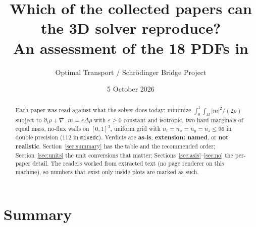 \documentclass[11pt]{article}
\title{Which of the collected papers can the 3D solver reproduce?\\
\large An assessment of the 18 PDFs in \code{Documents/papers/2026/OT\_SB\_examples}}
\author{Optimal Transport / Schr\"odinger Bridge Project}
\date{5 October 2026}
\newcommand{\eps}{\varepsilon}
\newcommand{\code}[1]{\texttt{#1}}
\newcommand{\dv}{\nabla\cdot}
\newcommand{\asis}{\textcolor{OliveGreen}{\textbf{as-is}}}
\newcommand{\ext}[1]{\textcolor{BurntOrange}{\textbf{extension: #1}}}
\newcommand{\no}{\textcolor{BrickRed}{\textbf{not realistic}}}
\begin{document}
\maketitle

\begin{abstract}
Each paper was read against what the solver does today: minimize
$\int_0^1\!\int_\Omega |m|^2/(2\rho)$ subject to
$\partial_t\rho+\dv m=\eps\Delta\rho$ with $\eps\ge0$ constant and isotropic,
two hard marginals of equal mass, no-flux walls on $[0,1]^3$, uniform grid with
$n_t=n_x=n_y=n_z\le 96$ in double precision ($112$ in \code{mixedc}). Verdicts
are \asis, \ext{named}, or \no. Section~\ref{sec:summary} has the table and the
recommended order; Section~\ref{sec:units} the unit conversions that matter;
Sections~\ref{sec:asis}--\ref{sec:no} the per-paper detail. The readers worked
from extracted text (no page renderer on this machine), so numbers that exist
only inside plots are marked as such.
\end{abstract}

\section{Summary}
\label{sec:summary}
\end{document}
